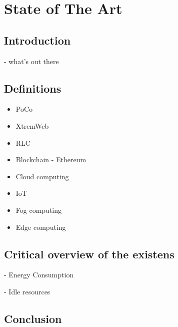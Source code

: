 

\chapter{State of The Art}

\ifpdf
    \graphicspath{{Chapter3/Figs/Raster/}{Chapter3/Figs/PDF/}{Chapter3/Figs/}}
\else
    \graphicspath{{Chapter3/Figs/Vector/}{Chapter3/Figs/}}
\fi


\section{Introduction}
- what's out there

\section{Definitions}
    \begin{itemize}
        \item PoCo
        \item XtremWeb
        \item RLC
        \item Blockchain - Ethereum
        \item Cloud computing
        \item IoT
        \item Fog computing
        \item Edge computing
    \end{itemize}

\section{Critical overview of the existens}
    - Energy Consumption
    
    - Idle resources

\section{Conclusion}